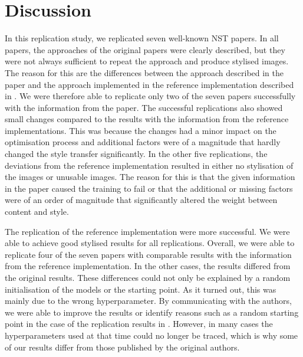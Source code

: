 \section{Discussion}

In this replication study, we replicated seven well-known NST papers. In all papers, the approaches of the original papers were clearly described, but they were not always sufficient to repeat the approach and produce stylised images. The reason for this are the differences between the approach described in the paper and the approach implemented in the reference implementation described in . We were therefore able to replicate only two of the seven papers successfully with the information from the paper. The successful replications also showed small changes compared to the results with the information from the reference implementations. This was because the changes had a minor impact on the optimisation process and additional factors were of a magnitude that hardly changed the style transfer significantly. In the other five replications, the deviations from the reference implementation resulted in either no stylisation of the images or unusable images. The reason for this is that the given information in the paper caused the training to fail or that the additional or missing factors were of an order of magnitude that significantly altered the weight between content and style.

The replication of the reference implementation were more successful. We were able to achieve good stylised results for all replications. Overall, we were able to replicate four of the seven papers with comparable results with the information from the reference implementation. In the other cases, the results differed from the original results. These differences could not only be explained by a random initialisation of the models or the starting point. As it turned out, this was mainly due to the wrong hyperparameter. By communicating with the authors, we were able to improve the results or identify reasons such as a random starting point in the case of the replication results in . However, in many cases the hyperparameters used at that time could no longer be traced, which is why some of our results differ from those published by the original authors.

